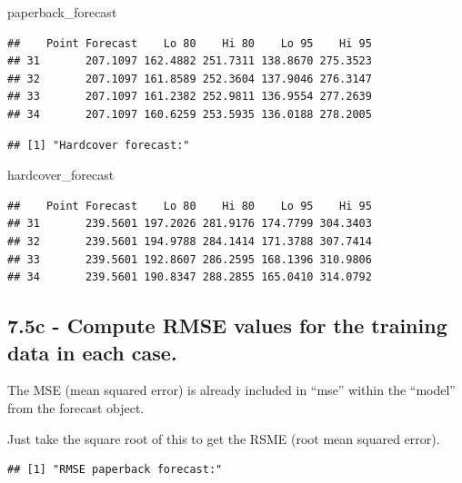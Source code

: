 \documentclass[]{book}
\newenvironment{Shaded}{\begin{snugshade}}{\end{snugshade}}
\newcommand{\KeywordTok}[1]{\textcolor[rgb]{0.13,0.29,0.53}{\textbf{#1}}}
\newcommand{\NormalTok}[1]{#1}
\newcommand{\OperatorTok}[1]{\textcolor[rgb]{0.81,0.36,0.00}{\textbf{#1}}}
\begin{document}
\begin{Shaded}
\begin{Highlighting}[]
\NormalTok{paperback_forecast}
\end{Highlighting}
\end{Shaded}

\begin{verbatim}
##    Point Forecast    Lo 80    Hi 80    Lo 95    Hi 95
## 31       207.1097 162.4882 251.7311 138.8670 275.3523
## 32       207.1097 161.8589 252.3604 137.9046 276.3147
## 33       207.1097 161.2382 252.9811 136.9554 277.2639
## 34       207.1097 160.6259 253.5935 136.0188 278.2005
\end{verbatim}

\begin{verbatim}
## [1] "Hardcover forecast:"
\end{verbatim}

\begin{Shaded}
\begin{Highlighting}[]
\NormalTok{hardcover_forecast}
\end{Highlighting}
\end{Shaded}

\begin{verbatim}
##    Point Forecast    Lo 80    Hi 80    Lo 95    Hi 95
## 31       239.5601 197.2026 281.9176 174.7799 304.3403
## 32       239.5601 194.9788 284.1414 171.3788 307.7414
## 33       239.5601 192.8607 286.2595 168.1396 310.9806
## 34       239.5601 190.8347 288.2855 165.0410 314.0792
\end{verbatim}

\hypertarget{c---compute-rmse-values-for-the-training-data-in-each-case.}{%
\subsection{7.5c - Compute RMSE values for the training data in each case.}\label{c---compute-rmse-values-for-the-training-data-in-each-case.}}

The MSE (mean squared error) is already included in ``mse'' within the ``model'' from the forecast object.

Just take the square root of this to get the RSME (root mean squared error).

\begin{verbatim}
## [1] "RMSE paperback forecast:"
\end{verbatim}

\begin{Shaded}
\end{Shaded}
\end{document}
